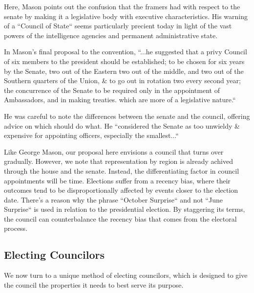 \documentclass{article}
\begin{document}
Here, Mason points out the confusion that the framers had with respect to the senate by making it a legislative body with executive characteristics. His warning of a “Council of State“ seems particularly precient today in light of the vast powers of the intelligence agencies and permanent administrative state.\cite{Cooper}

In Mason's final proposal to the convention, “...he suggested that a privy Council of six members to the president should be established; to be chosen for six years by the Senate, two out of the Eastern two out of the middle, and two out of the Southern quarters of the Union, \& to go out in rotation two every second year; the concurrence of the Senate to be required only in the appointment of Ambassadors, and in making treaties. which are more of a legislative nature.“\cite{Madison}

He was careful to note the differences between the senate and the council, offering advice on which should do what. He “considered the Senate as too unwieldy \& expensive for appointing officers, especially the smallest...“

Like George Mason, our proposal here envisions a council that turns over gradually. However, we note that representation by region is already achived through the house and the senate. Instead, the differentiating factor in council appointments will be time. Elections suffer from a recency bias, where their outcomes tend to be disproportionally affected by events closer to the election date. There's a reason why the phrase “October Surprise“ and not “June Surprise“ is used in relation to the presidential election. By staggering its terms, the council can counterbalance the recency bias that comes from the electoral process.

\subsection{Electing Councilors}

We now turn to a unique method of electing councilors, which is designed to give the council the properties it needs to best serve its purpose.
\end{document}
